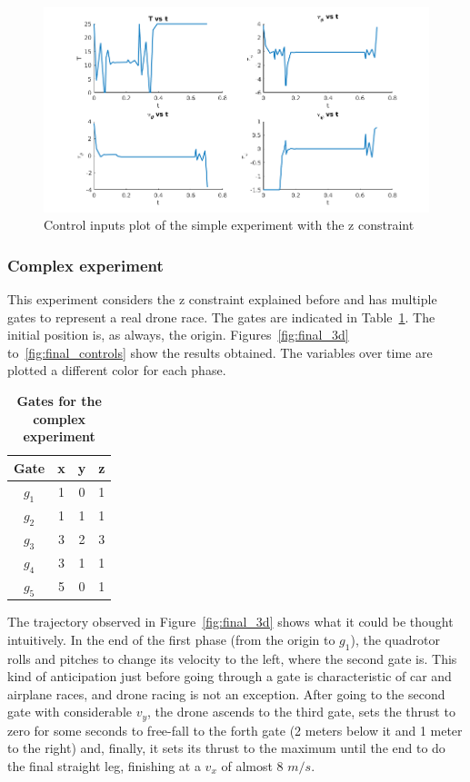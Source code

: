 \documentclass[letterpaper, 10 pt, conference]{ieeeconf}  %
\begin{document}
\begin{figure}[!htpb]
	\centering
	\includegraphics[width=1.0\linewidth]{Images/simple_zconstr/controls.png}
	\caption{Control inputs plot of the simple experiment with the z constraint}
	\label{fig:simple_zconstr_controls}
\end{figure}

\subsubsection{Complex experiment}

This experiment considers the z constraint explained before and has multiple gates to represent a real drone race. The gates are indicated in Table~\ref{tbl:gates}. The initial position is, as always, the origin. Figures~\ref{fig:final_3d} to~\ref{fig:final_controls} show the results obtained. The variables over time are plotted a different color for each phase.

\begin{table}[!htpb]
	\caption[Gates]{\bf Gates for the complex experiment}
	\label{tbl:gates}
	\centering
	\def\arraystretch{1.3}
	\setlength{\tabcolsep}{3pt}
	\begin{tabular}{cccc}
		\textbf{Gate} & \textbf{x} & \textbf{y} & \textbf{z} \\ 
		\hline
		$g_1$ & 1 & 0 & 1 \\ 
		$g_2$ & 1 & 1 & 1 \\ 
		$g_3$ & 3 & 2 & 3 \\ 
		$g_4$ & 3 & 1 & 1 \\ 
		$g_5$ & 5 & 0 & 1 \\ 
	\end{tabular}
\end{table}

The trajectory observed in Figure~\ref{fig:final_3d} shows what it could be thought intuitively. In the end of the first phase (from the origin to $g_1$), the quadrotor rolls and pitches to change its velocity to the left, where the second gate is. This kind of anticipation just before going through a gate is characteristic of car and airplane races, and drone racing is not an exception. After going to the second gate with considerable $v_y$, the drone ascends to the third gate, sets the thrust to zero for some seconds to free-fall to the forth gate (2 meters below it and 1 meter to the right) and, finally, it sets its thrust to the maximum until the end to do the final straight leg, finishing at a $v_x$ of almost 8 $m/s$. %
\end{document}
